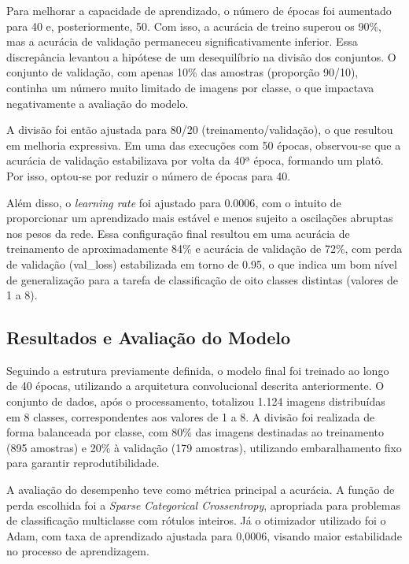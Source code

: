 Para melhorar a capacidade de aprendizado, o número de épocas foi aumentado para 40 e, posteriormente, 
50. Com isso, a acurácia de treino superou os 90\%, mas a acurácia de validação permaneceu 
significativamente inferior. Essa discrepância levantou a hipótese de um desequilíbrio na divisão dos 
conjuntos. O conjunto de validação, com apenas 10\% das amostras (proporção 90/10), continha um número 
muito limitado de imagens por classe, o que impactava negativamente a avaliação do modelo.

A divisão foi então ajustada para 80/20 (treinamento/validação), o que resultou em melhoria 
expressiva. Em uma das execuções com 50 épocas, observou-se que a acurácia de validação estabilizava 
por volta da 40ª época, formando um platô. Por isso, optou-se por reduzir o número de épocas para 40.

Além disso, o \textit{learning rate} foi ajustado para $0.0006$, com o intuito de proporcionar um 
aprendizado mais estável e menos sujeito a oscilações abruptas nos pesos da rede. Essa configuração 
final resultou em uma acurácia de treinamento de aproximadamente 84\% e acurácia de validação de 72\%, 
com perda de validação (val\_loss) estabilizada em torno de 0.95, o que indica um bom nível de generalização 
para a tarefa de classificação de oito classes distintas (valores de 1 a 8).

\subsection{Resultados e Avaliação do Modelo}

Seguindo a estrutura previamente definida, o modelo final foi treinado ao longo de 40 épocas, utilizando a arquitetura convolucional 
descrita anteriormente. O conjunto de dados, após o processamento, totalizou 1.124 imagens distribuídas em 8 classes, correspondentes 
aos valores de 1 a 8. A divisão foi realizada de forma balanceada por classe, com 80\% das imagens destinadas ao treinamento (895 amostras) 
e 20\% à validação (179 amostras), utilizando embaralhamento fixo para garantir reprodutibilidade.

A avaliação do desempenho teve como métrica principal a acurácia. A função de perda escolhida foi a \textit{Sparse Categorical Crossentropy}, 
apropriada para problemas de classificação multiclasse com rótulos inteiros. Já o otimizador utilizado foi o Adam, com taxa de aprendizado 
ajustada para 0{,}0006, visando maior estabilidade no processo de aprendizagem.

